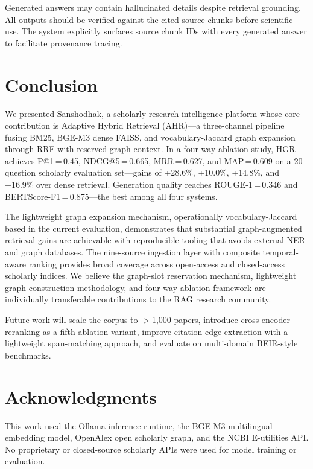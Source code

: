 \documentclass[conference,10pt,twocolumn]{IEEEtran}
\begin{document}
Generated answers may contain hallucinated details despite retrieval grounding. All outputs should be verified against the cited source chunks before scientific use. The system explicitly surfaces source chunk IDs with every generated answer to facilitate provenance tracing.

\section{Conclusion}
\label{sec:conclusion}

We presented Sanshodhak, a scholarly research-intelligence platform whose core contribution is Adaptive Hybrid Retrieval (AHR)---a three-channel pipeline fusing BM25, BGE-M3 dense FAISS, and vocabulary-Jaccard graph expansion through RRF with reserved graph context. In a four-way ablation study, HGR achieves P@1\,=\,0.45, NDCG@5\,=\,0.665, MRR\,=\,0.627, and MAP\,=\,0.609 on a 20-question scholarly evaluation set---gains of +28.6\%, +10.0\%, +14.8\%, and +16.9\% over dense retrieval. Generation quality reaches ROUGE-1\,=\,0.346 and BERTScore-F1\,=\,0.875---the best among all four systems.

The lightweight graph expansion mechanism, operationally vocabulary-Jaccard based in the current evaluation, demonstrates that substantial graph-augmented retrieval gains are achievable with reproducible tooling that avoids external NER and graph databases. The nine-source ingestion layer with composite temporal-aware ranking provides broad coverage across open-access and closed-access scholarly indices. We believe the graph-slot reservation mechanism, lightweight graph construction methodology, and four-way ablation framework are individually transferable contributions to the RAG research community.

Future work will scale the corpus to $>$1,000 papers, introduce cross-encoder reranking as a fifth ablation variant, improve citation edge extraction with a lightweight span-matching approach, and evaluate on multi-domain BEIR-style benchmarks.

\section*{Acknowledgments}

This work used the Ollama inference runtime, the BGE-M3 multilingual embedding model, OpenAlex open scholarly graph, and the NCBI E-utilities API. No proprietary or closed-source scholarly APIs were used for model training or evaluation.
\end{document}
